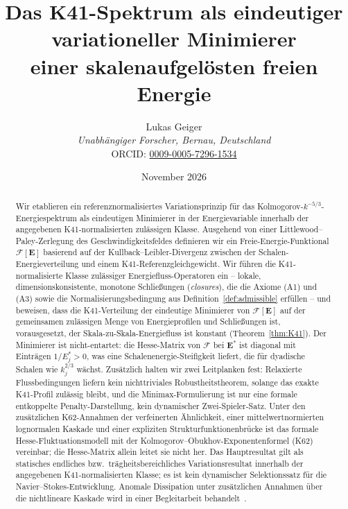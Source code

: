 \documentclass[12pt,a4paper]{article}
\title{Das K41-Spektrum als eindeutiger variationeller Minimierer\\
einer skalenaufgelösten freien Energie}
\author{Lukas Geiger\\
\textit{Unabhängiger Forscher, Bernau, Deutschland}\\
ORCID: \href{https://orcid.org/0009-0005-7296-1534}{0009-0005-7296-1534}}
\date{November 2026}
\theoremstyle{definition}
\theoremstyle{plain}
\theoremstyle{remark}
\begin{document}
\maketitle

\begin{abstract}
Wir etablieren ein referenznormalisiertes Variationsprinzip für das
Kolmogorov-$k^{-5/3}$-Energiespektrum als eindeutigen Minimierer in der
Energievariable innerhalb der angegebenen K41-normalisierten zulässigen
Klasse. Ausgehend von einer
Littlewood--Paley-Zerlegung des Geschwindigkeitsfeldes definieren wir ein
Freie-Energie-Funktional $\mathcal{F}[\mathbf{E}]$ basierend auf der
Kullback--Leibler-Divergenz zwischen der Schalen-Energieverteilung und einem
K41-Referenzgleichgewicht. Wir führen die K41-normalisierte Klasse zulässiger
Energiefluss-Operatoren ein -- lokale, dimensionskonsistente, monotone
Schließungen (\emph{closures}), die die Axiome (A1) und (A3) sowie die
Normalisierungsbedingung aus Definition~\ref{def:admissible} erfüllen --
und beweisen, dass die K41-Verteilung der eindeutige Minimierer von
$\mathcal{F}[\mathbf{E}]$ auf der gemeinsamen zulässigen Menge von
Energieprofilen und Schließungen ist, vorausgesetzt, der Skala-zu-Skala-Energiefluss
ist konstant (Theorem~\ref{thm:K41}). Der
Minimierer ist nicht-entartet: die Hesse-Matrix von $\mathcal{F}$ bei
$\mathbf{E}^*$ ist diagonal mit Einträgen $1/E_j^* > 0$, was eine
Schalenenergie-Steifigkeit liefert, die für dyadische Schalen wie
$k_j^{2/3}$ wächst. Zusätzlich
halten wir zwei Leitplanken fest: Relaxierte Flussbedingungen liefern kein
nichttriviales Robustheitstheorem, solange das exakte K41-Profil zulässig
bleibt, und die Minimax-Formulierung ist nur eine formale entkoppelte
Penalty-Darstellung, kein dynamischer Zwei-Spieler-Satz.
Unter den zusätzlichen K62-Annahmen der verfeinerten Ähnlichkeit, einer
mittelwertnormierten lognormalen Kaskade und einer expliziten
Strukturfunktionenbrücke ist das formale Hesse-Fluktuationsmodell mit
der Kolmogorov--Obukhov-Exponentenformel (K62) vereinbar; die Hesse-Matrix
allein leitet sie nicht her. Das Hauptresultat gilt als statisches
endliches bzw.\ trägheitsbereichliches Variationsresultat innerhalb der
angegebenen K41-normalisierten Klasse; es ist kein dynamischer
Selektionssatz für die Navier--Stokes-Entwicklung. Anomale Dissipation
unter zusätzlichen Annahmen über die nichtlineare Kaskade wird in einer
Begleitarbeit behandelt~\cite{Geiger2026b}.
\end{abstract}
\end{document}
